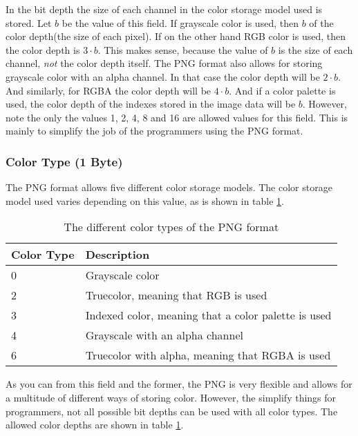 In the bit depth the size of each channel in the color storage model
used is stored. Let $b$ be the value of this field. If grayscale color
is used, then $b$ of the color depth(the size of each pixel). If on
the other hand RGB color is used, then the color depth is $3 \cdot
b$. This makes sense, because the value of $b$ is the size of each
channel, \textit{not} the color depth itself. The PNG format also
allows for storing grayscale color with an alpha channel. In that case
the color depth will be $2 \cdot b$. And similarly, for RGBA the color
depth will be $4 \cdot b$. And if a color palette is used, the color
depth of the indexes stored in the image data will be $b$. However,
note the only the values 1, 2, 4, 8 and 16 are allowed values for this
field. This is mainly to simplify the job of the programmers using the
PNG format.

\subsubsection*{Color Type (1 Byte)}

The PNG format allows five different color storage models. The color
storage model used varies depending on this value, as is shown in
table \ref{tab:png-color-type}.

\begin{table}
  \centering
  \begin{tabular}{l l}
    \toprule
    Color Type & Description \\
    \midrule
    0 & Grayscale color \\
    2 & Truecolor, meaning that RGB is used \\
    3 & Indexed color, meaning that a color palette is used \\
    4 & Grayscale with an alpha channel \\
    6 & Truecolor with alpha, meaning that RGBA is used \\
    \bottomrule
  \end{tabular}
  \caption{The different color types of the PNG format}
  \label{tab:png-color-type}
\end{table}

As you can from this field and the former, the PNG is very flexible
and allows for a multitude of different ways of storing
color. However, the simplify things for programmers, not all possible
bit depths can be used with all color types. The allowed color depths
are shown in table \ref{tab:png-color-type}.

